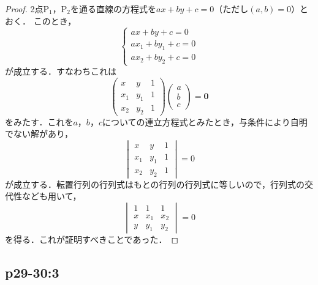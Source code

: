 \documentclass[uplatex,dvipdfmx,a4paper,11pt,fleqn]{jsarticle}
\begin{document}
\begin{tleftbar}
    \begin{proof}
    2点$\mathrm{P}_1$，$\mathrm{P_2}$を通る直線の方程式を$ax+by+c=0$（ただし$(a,b)=0$）とおく．
    このとき，
    \[
        \begin{cases}
            ax+by+c =0 \\
            ax_1 + by_1 +c=0 \\
            ax_2 + by_2 +c =0
        \end{cases}
    \]
    が成立する．すなわちこれは
    \[
        \begin{pmatrix} 
            x & y & 1 \\
            x_1 & y_1 & 1 \\
            x_2 & y_2 & 1 
        \end{pmatrix}
        \begin{pmatrix}
            a \\
            b \\
            c
        \end{pmatrix}
        = \bm{0}
    \]
    をみたす．これを$a$，$b$，$c$についての連立方程式とみたとき，与条件により自明でない解があり，
    \[
    \begin{vmatrix} 
        x & y & 1 \\
        x_1 & y_1 & 1 \\
        x_2 & y_2 & 1 
    \end{vmatrix}
    =0
    \]
    が成立する．転置行列の行列式はもとの行列の行列式に等しいので，行列式の交代性なども用いて，
    \[ 
    \begin{vmatrix} 
        1 & 1 & 1 \\
        x & x_1 & x_2 \\
        y & y_1 & y_2 
    \end{vmatrix}
    =0
    \]
を得る．これが証明すべきことであった．
\end{proof}
\end{tleftbar}



\subsection*{p29-30:3}
\end{document}
